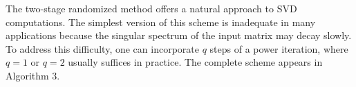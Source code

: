 \documentclass[12pt]{article}
\begin{document}


The two-stage randomized method offers a natural approach to SVD computations.
The simplest version of this scheme is inadequate in many
applications because the singular spectrum of the input matrix may decay
slowly.  To address this difficulty, one can incorporate $q$ steps of a power
iteration, where $q = 1$ or $q = 2$ usually suffices in practice.  The
complete scheme appears in Algorithm 3.
\end{document}
